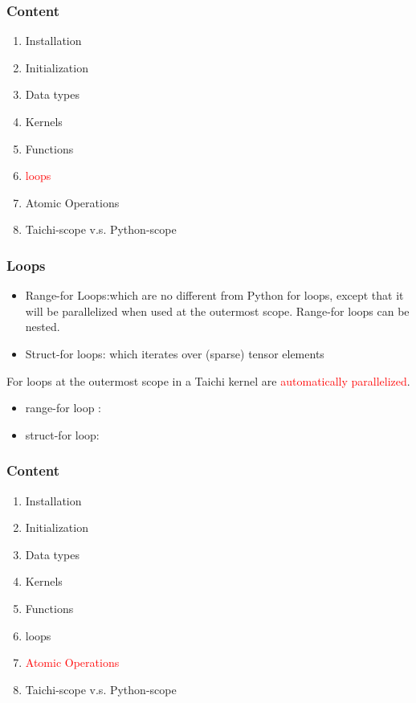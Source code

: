 \documentclass[serif,mathserif]{beamer}
\begin{document}
\begin{CJK}{UTF8}{gbsn}
\begin{frame}

  
\end{frame}

\begin{frame}
  \frametitle{Content}
  \begin{enumerate}
  \item Installation
  \item Initialization
  \item Data types
  \item Kernels
  \item Functions
  \item \textcolor{red}{loops}
  \item Atomic Operations
  \item Taichi-scope v.s. Python-scope
  \end{enumerate}
\end{frame}

\begin{frame}
  \frametitle{Loops}
  \begin{itemize}
  \item Range-for Loops:which are no different from Python for loops, except that it will be parallelized when used at the outermost scope. Range-for loops can be nested.\newline
  \item Struct-for loops: which iterates over (sparse) tensor elements\newline
  \end{itemize}

  For loops at the outermost scope in a Taichi kernel are \textcolor{red}{automatically parallelized}.\newline\newline
  \begin{itemize}
  \item range-for loop :
  \item struct-for loop:
  \end{itemize}
\end{frame}

\begin{frame}
  \frametitle{Content}
  \begin{enumerate}
  \item Installation
  \item Initialization
  \item Data types
  \item Kernels
  \item Functions
  \item loops
  \item \textcolor{red}{Atomic Operations}
  \item Taichi-scope v.s. Python-scope
  \end{enumerate}
\end{frame}


\end{CJK}
\end{document}

